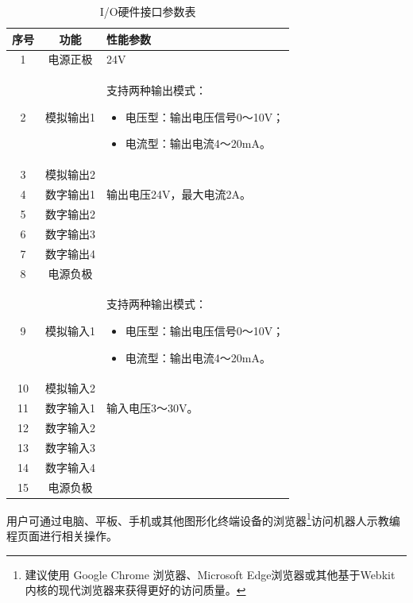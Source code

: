 \begin{table}[ht]
    \centering
\begin{tabularx}{\textwidth}{ccX}
    序号	&   功能	&   性能参数\\\hline
    1	&   电源正极	& 24V  \\
    2	&   模拟输出1   &  
        支持两种输出模式：
        \begin{itemize}
\setlength{\itemsep}{0pt}
\setlength{\topsep}{0pt}
\setlength{\parsep}{0pt}
\setlength{\parskip}{0pt}
            \item 电压型：输出电压信号0～10V；
            \item 电流型：输出电流4～20mA。
        \end{itemize}
    \\
    3	&   模拟输出2 & \\
    4	&   数字输出1	&   输出电压24V，最大电流2A。\\
    5	&   数字输出2	&   \\
    6	&   数字输出3	&   \\
    7	&   数字输出4	&   \\
    8	&   电源负极	&   \\
    9	&   模拟输入1 &   
        支持两种输出模式：
        \begin{itemize}
            \setlength{\itemsep}{0pt}
            \setlength{\topsep}{0pt}
            \setlength{\parsep}{0pt}
            \setlength{\parskip}{0pt}
            \item 电压型：输出电压信号0～10V；
            \item 电流型：输出电流4～20mA。
        \end{itemize}
    \\
    10	&   模拟输入2	&   \\
    11	&   数字输入1	&   输入电压3～30V。\\
    12	&   数字输入2	&   \\
    13	&   数字输入3	&   \\
    14	&   数字输入4	&   \\
    15	&   电源负极	   &     \\
\end{tabularx}
\caption{I/O硬件接口参数表}
\end{table}


用户可通过电脑、平板、手机或其他图形化终端设备的浏览器\footnote{建议使用 Google Chrome 浏览器、Microsoft Edge浏览器或其他基于Webkit 内核的现代浏览器来获得更好的访问质量。}访问机器人示教编程页面进行相关操作。




